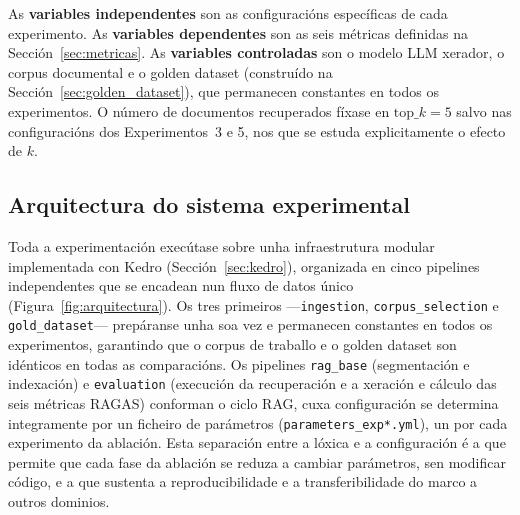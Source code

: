 \documentclass[11pt, a4paper, oneside]{report}
\begin{document}
As \textbf{variables independentes} son as configuracións específicas de cada
experimento.
As \textbf{variables dependentes} son as seis métricas definidas na
Sección~\ref{sec:metricas}.
As \textbf{variables controladas} son o modelo LLM xerador, o corpus documental e o
golden dataset (construído na Sección~\ref{sec:golden_dataset}), que permanecen
constantes en todos os experimentos.
O número de documentos recuperados fíxa\-se en $\text{top}\_k = 5$ salvo nas
configuracións dos Experimentos~3 e 5, nos que se estuda explicitamente o efecto de $k$.

\subsection{Arquitectura do sistema experimental}
\label{sec:arquitectura}

Toda a experimentación execútase sobre unha infraestrutura modular implementada con Kedro
(Sección~\ref{sec:kedro}), organizada en cinco pipelines independentes que se encadean
nun fluxo de datos único (Figura~\ref{fig:arquitectura}). Os tres primeiros
—\texttt{ingestion}, \texttt{corpus\_selection} e \texttt{gold\_dataset}— prepáranse unha
soa vez e permanecen constantes en todos os experimentos, garantindo que o corpus de
traballo e o golden dataset son idénticos en todas as comparacións. Os pipelines
\texttt{rag\_base} (segmentación e indexación) e \texttt{evaluation} (execución da
recuperación e a xeración e cálculo das seis métricas RAGAS) conforman o ciclo RAG, cuxa
configuración se determina integramente por un ficheiro de parámetros
(\texttt{parameters\_exp*.yml}), un por cada experimento da ablación. Esta separación entre
a lóxica e a configuración é a que permite que cada fase da ablación se reduza a cambiar
parámetros, sen modificar código, e a que sustenta a reproducibilidade e a transferibilidade
do marco a outros dominios.
\end{document}

